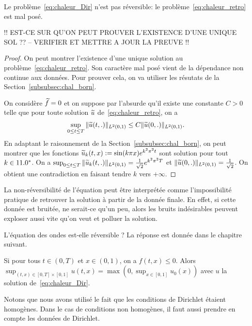 \documentclass[12pt,a4paper,twoside]{article}
\begin{document}
\begin{proposition}
  Le probl\`eme~\eqref{eq:chaleur_Dir} n'est pas r\'eversible:
  le probl\`eme~\eqref{eq:chaleur_retro} est mal pos\'e.
\end{proposition}

!! EST-CE SUR QU'ON PEUT PROUVER L'EXISTENCE D'UNE UNIQUE SOL ??
-- VERIFIER ET METTRE A JOUR LA PREUVE !!

\begin{proof}
  On peut montrer l'existence d'une unique solution au probl\`eme~\eqref{eq:chaleur_retro}.
  Son caract\`ere mal pos\'e vient de la d\'ependance non continue aux donn\'ees.
  Pour prouver cela, on va utiliser les r\'esutats de la Section~\ref{subsubsec:chal_born}.


  On consid\`ere $\widetilde{f} = 0$ et on suppose par l'absurde qu'il existe une constante $C>0$ telle que
  pour toute solution $\widetilde{u}$ de~\eqref{eq:chaleur_retro}, on a
  \begin{align*}
    \sup_{0 \leq t \leq T} \| \widetilde{u}(t,.) \|_{L^2(0,1)} \leq C \| \widetilde{u}(0,.) \|_{L^2(0,1)} .
  \end{align*}
  En adaptant le raisonnement de la Section~\ref{subsubsec:chal_born}, on peut montrer que
  les fonctions $\widetilde{u}_k (t,x) := \sin(k\pi x) e^{k^2 \pi^2 t}$ sont solution pour tout $k \in 11.0^*$.
  On a $\sup_{0 \leq t \leq T} \| \widetilde{u}_k(t,.) \|_{L^2(0,1)} = \frac1{\sqrt2} e^{k^2 \pi^2 T}$ et 
  $\| \widetilde{u}(0,.) \|_{L^2(0,1)} = \frac1{\sqrt2}$. On obtient une contradiction en faisant tendre $k$
  vers $+ \infty$.
\end{proof}


\begin{remark}
  La non-r\'eversibilit\'e de l'\'equation peut \^etre interpr\'et\'ee comme l'impossibilit\'e
  pratique de retrouver la solution \`a partir de la donn\'ee finale.
  En effet, si cette donn\'ee est bruit\'ee, ne serait-ce qu'un peu, alors les bruits
  ind\'esirables peuvent exploser aussi vite qu'on veut et polluer la solution.
\end{remark}

\begin{exercise}
  L'\'equation des ondes est-elle r\'eversible ?
  La r\'eponse est donn\'ee dans le chapitre suivant.
\end{exercise}


\begin{proposition}
  Si pour tous $t \in (0,T)$ et $x \in (0,1)$, on a $f(t,x) \leq 0$.
  Alors $\sup_{(t,x) \in [0,T] \times [0,1]} u(t,x) = \max(0, \sup_{x \in [0,1]} u_0(x))$
  avec $u$ la solution de~\eqref{eq:chaleur_Dir}.
\end{proposition}
Notons que nous avons utilis\'e le fait que les conditions de Dirichlet \'etaient homog\`enes.
Dans le cas de conditions non homog\`enes, il faut aussi prendre en compte
les donn\'ees de Dirichlet.
\end{document}
